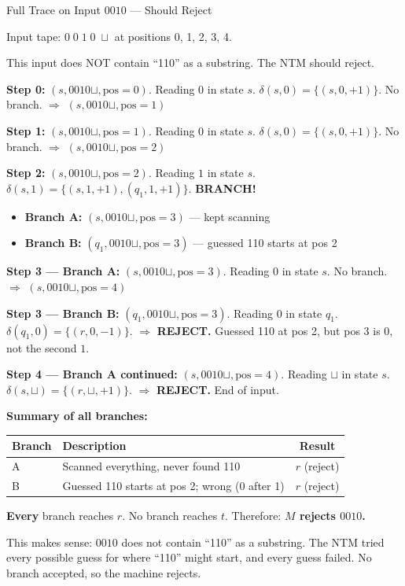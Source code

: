 \begin{examplebox}{Full Trace on Input $0010$ --- Should Reject}

Input tape: $\boxed{0}\;\boxed{0}\;\boxed{1}\;\boxed{0}\;\boxed{\sqcup}$
at positions 0, 1, 2, 3, 4.

This input does NOT contain ``110'' as a substring. The NTM should reject.

\textbf{Step 0:} $(s, 0010\sqcup, \text{pos}=0)$.
Reading $0$ in state $s$. $\delta(s, 0) = \{(s, 0, +1)\}$. No branch.
$\Rightarrow$ $(s, 0010\sqcup, \text{pos}=1)$

\textbf{Step 1:} $(s, 0010\sqcup, \text{pos}=1)$.
Reading $0$ in state $s$. $\delta(s, 0) = \{(s, 0, +1)\}$. No branch.
$\Rightarrow$ $(s, 0010\sqcup, \text{pos}=2)$

\textbf{Step 2:} $(s, 0010\sqcup, \text{pos}=2)$.
Reading $1$ in state $s$. $\delta(s, 1) = \{(s, 1, +1), (q_1, 1, +1)\}$.
\textbf{BRANCH!}
\begin{itemize}[nosep]
\item \textbf{Branch A:} $(s, 0010\sqcup, \text{pos}=3)$ --- kept scanning
\item \textbf{Branch B:} $(q_1, 0010\sqcup, \text{pos}=3)$ --- guessed 110
  starts at pos 2
\end{itemize}

\textbf{Step 3 --- Branch A:} $(s, 0010\sqcup, \text{pos}=3)$.
Reading $0$ in state $s$. No branch.
$\Rightarrow$ $(s, 0010\sqcup, \text{pos}=4)$

\textbf{Step 3 --- Branch B:} $(q_1, 0010\sqcup, \text{pos}=3)$.
Reading $0$ in state $q_1$. $\delta(q_1, 0) = \{(r, 0, -1)\}$.
$\Rightarrow$ \textcolor{red!70!black}{\textbf{REJECT.}} Guessed 110 at pos 2,
but pos 3 is $0$, not the second $1$.

\textbf{Step 4 --- Branch A continued:} $(s, 0010\sqcup, \text{pos}=4)$.
Reading $\sqcup$ in state $s$. $\delta(s, \sqcup) = \{(r, \sqcup, +1)\}$.
$\Rightarrow$ \textcolor{red!70!black}{\textbf{REJECT.}} End of input.

\textbf{Summary of all branches:}
\begin{center}
\renewcommand{\arraystretch}{1.3}
\begin{tabular}{llc}
\toprule
\textbf{Branch} & \textbf{Description} & \textbf{Result} \\
\midrule
A & Scanned everything, never found 110 & $r$ (reject) \\
B & Guessed 110 starts at pos 2; wrong (0 after 1) & $r$ (reject) \\
\bottomrule
\end{tabular}
\end{center}

\textbf{Every} branch reaches $r$. No branch reaches $t$. Therefore:
\textbf{$M$ rejects $0010$.}

This makes sense: $0010$ does not contain ``110'' as a substring. The NTM tried
every possible guess for where ``110'' might start, and every guess failed. No
branch accepted, so the machine rejects.

\end{examplebox}

